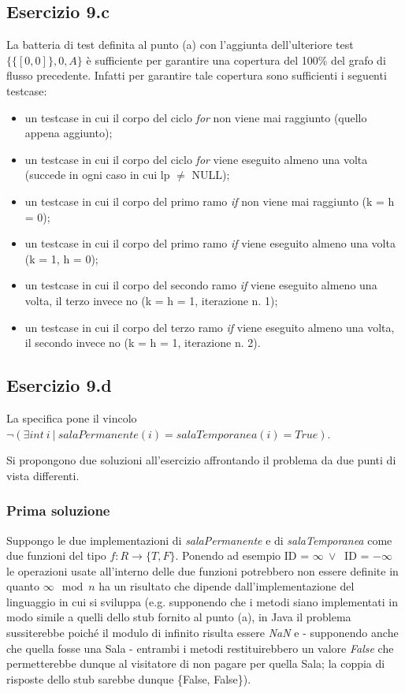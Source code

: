 \documentclass[10pt, italian, openany, landscape]{book}
\begin{document}
\subsection{Esercizio 9.c}
La batteria di test definita al punto (a) con l'aggiunta dell'ulteriore test \( \{\{[0, 0]\}, 0 , A\} \) \`e sufficiente per garantire una copertura
del 100\% del grafo di flusso precedente. Infatti per garantire tale copertura sono sufficienti i seguenti testcase:
\begin{itemize}
    \item un testcase in cui il corpo del ciclo \textit{for} non viene mai raggiunto (quello appena aggiunto);
    \item un testcase in cui il corpo del ciclo \textit{for} viene eseguito almeno una volta (succede in ogni caso in cui lp \( \neq \) NULL);
    \item un testcase in cui il corpo del primo ramo \textit{if} non viene mai raggiunto (k = h = 0);
    \item un testcase in cui il corpo del primo ramo \textit{if} viene eseguito almeno una volta (k = 1, h = 0);
    \item un testcase in cui il corpo del secondo ramo \textit{if} viene eseguito almeno una volta, il terzo invece no (k = h = 1, iterazione n. 1);
    \item un testcase in cui il corpo del terzo ramo \textit{if} viene eseguito almeno una volta, il secondo invece no (k = h = 1, iterazione n. 2).
\end{itemize}

\subsection{Esercizio 9.d}
La specifica pone il vincolo \( \neg(\exists int \ i \ | \ salaPermanente(i) = salaTemporanea(i) = True) \).

Si propongono due soluzioni all'esercizio affrontando il problema da due punti di vista differenti.


\subsubsection{Prima soluzione}
Suppongo le due implementazioni di \textit{salaPermanente} e di \textit{salaTemporanea} come due funzioni del tipo \( f : R \rightarrow \{T, F\} \).
Ponendo ad esempio ID = \( \infty \ \lor \ \) ID = \( - \infty \) le operazioni usate all'interno delle due funzioni
potrebbero non essere definite in quanto \( \infty \mod{n} \) ha un risultato che dipende dall'implementazione del linguaggio in cui si sviluppa
(e.g. supponendo che i metodi siano implementati in modo simile a quelli dello stub fornito al punto (a), in Java il problema sussiterebbe poich\'e il
modulo di infinito risulta essere \textit{NaN} e - supponendo anche che quella fosse una Sala - entrambi i metodi restituirebbero un valore \textit{False}
che permetterebbe dunque al visitatore di non pagare per quella Sala; la coppia di risposte dello stub sarebbe dunque \{False, False\}).
\end{document}
